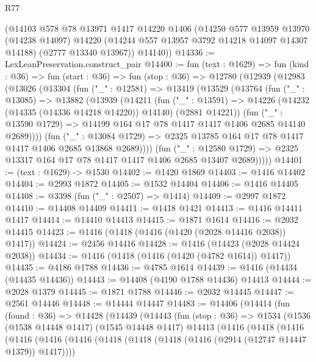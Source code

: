 \begin{lexlean}{R77}
\begin{coremodule}
{{      (@14103
        @578
        @78
        @13971
        @1417
        @14220
        @1406
        (@14250
          @577
          @13959
          @13970
          (@14238 @14097)
          @14220
          (@14244 @557 @13957 @3792 @14218 @14097 @14307 @14188)
          (@2777 @13340 @13967))
        @14140))
@14336 := LexLeanPreservation.construct_pair
@14400 := fun (text : @1629) =>
  fun (kind : @36) =>
  fun (start : @36) =>
  fun (stop : @36) =>
  @12780
    (@12939
      (@12983
        (@13026
          (@13304
            (fun ("_" : @12581) =>
            @13419
              (@13529
                (@13764
                  (fun ("_" : @13085) =>
                  @13882
                    (@13939
                      (@14211
                        (fun ("_" : @13591) =>
                        @14226 (@14232 (@14335 (@14336 @14218 @14220)) @14140) (@2881 @14221))
                        (fun ("_" : @13590 @1729) =>
                        @14199 @164 @17 @78 @1417 @1417 @1406 @2685 @14140 @2689))))
                  (fun ("_" : @13084 @1729) =>
                  @2325 @13785 @164 @17 @78 @1417 @1417 @1406 @2685 @13868 @2689))))
            (fun ("_" : @12580 @1729) =>
            @2325 @13317 @164 @17 @78 @1417 @1417 @1406 @2685 @13407 @2689)))))
@14401 := (text : @1629) -> @1530
@14402 := @1420 @1869
@14403 := @1416 @14402
@14404 := @2993 @1872
@14405 := @1532 @14404
@14406 := @1416 @14405
@14408 := @3398 (fun ("_" : @2507) => @1414)
@14409 := @2997 @1872
@14410 := @14408 @14409
@14411 := @1418 @1421
@14413 := @1416 @14411 @1417
@14414 := @14410 @14413
@14415 := @1871 @1614
@14416 := @2032 @14415
@14423 := @1416 (@1418 (@1416 (@1420 (@2028 @14416 @2038)) @1417))
@14424 := @2456 @14416
@14428 := @1416 (@14423 (@2028 @14424 @2038))
@14434 := @1416 (@1418 (@1416 (@1420 (@4782 @1614)) @1417))
@14435 := @4186 @1788
@14436 := @4785 @1614
@14439 := @1416 (@14434 (@14435 @14436))
@14443 := @14408 (@4190 @1788 @14436) @14413
@14444 := @2028 @1379
@14445 := @1871 @1788
@14446 := @2032 @14445
@14447 := @2561 @14446
@14448 := @14444 @14447
@14483 := @14406
    (@14414
      (fun (found : @36) =>
      @14428
        (@14439
          (@14443
            (fun (stop : @36) =>
            @1534
              (@1536
                (@1538 @14448 @1417)
                (@1545 @14448 @1417)
                @14413
                (@1416
                  (@1418
                    (@1416
                      (@1416
                        (@1416
                          (@1416
                            (@1418 (@1418 (@1418 (@1416 (@2914 (@12747 @14447 @1379)) @1417))))
}}
\end{coremodule}
\end{lexlean}
